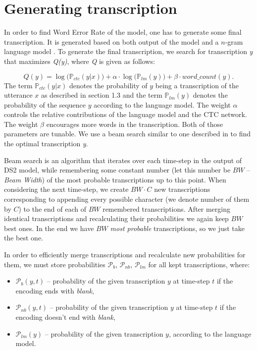 \documentclass[licencjacka,en]{pracamgr}
\begin{document}
\section{Generating transcription} \label{sec:transcription}
In order to find Word Error Rate of the model, one has to generate some final transcription. It is generated based on both output of the model and a $n$-gram language model \cite{DS9}. To generate the final transcription, we search for transcription \textit{y} that maximizes \textit{Q(y)}, where \textit{Q} is given as follows:

$$
Q(y) = \log \big(\mathbb{P}_{ctc}(y|x)\big) + \alpha \cdot \log \big( \mathbb{P}_{lm}(y) \big) + \beta \cdot word\_count(y).
$$
The term $\mathbb{P}_{ctc}(y|x)$ denotes the probability of $y$ being a transcription of the utterance $x$ as described in section 1.3 and the term $\mathbb{P}_{lm}(y)$ denotes the probability of the sequence $y$ according to the language model. The weight $\alpha$ controls the relative contributions of the language model and the CTC network. The weight $\beta$ encourages more words in the transcription. Both of those parameters are tunable. We use a beam search similar to one described in \cite{DS7} to find the optimal transcription \textit{y}.

Beam search is an algorithm that iterates over each time-step in the output of DS2 model, while remembering some constant number (let this number be $BW$ -- \textit{Beam Width}) of the most probable transcriptions up to this point. When considering the next time-step, we create $BW \cdot C$ new transcriptions corresponding to appending every possible character (we denote number of them by $C$) to the end of each of $BW$ remembered transcriptions. After merging identical transcriptions and recalculating their probabilities we again keep $BW$ best ones. In the end we have $BW$ \textit{most probable} transcriptions, so we just take the best one.

In order to efficiently merge transcriptions and recalculate new probabilities for them, we must store probabilities $\mathcal{P}_{b}$, $\mathcal{P}_{nb}$, $\mathcal{P}_{lm}$ for all kept transcriptions, where:
\begin{itemize}
\item $\mathcal{P}_{b}(y, t)$ -- probability of the given transcription $y$ at time-step $t$ if the encoding ends with \textit{blank},
\item $\mathcal{P}_{nb}(y, t)$ -- probability of the given transcription $y$ at time-step $t$ if the encoding doesn't end with \textit{blank},
\item $\mathcal{P}_{lm}(y)$ -- probability of the given transcription $y$, according to the language model.\\
\end{itemize}
\end{document}
